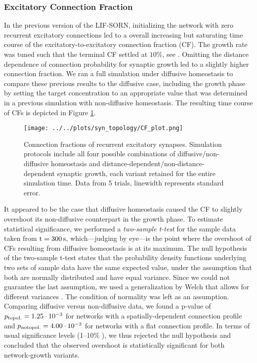 \documentclass[10pt,a4paper]{article}
\begin{document}
\subsubsection{Excitatory Connection Fraction}
In the previous version of the LIF-SORN, initializing the network with zero recurrent excitatory connections led to a overall increasing but saturating time course of the excitatory-to-excitatory connection fraction (CF). The growth rate was tuned such that the terminal CF settled at $\mathrm{10\%}$, see \cite[p. 8]{SORN_Paper}. Omitting the distance dependence of connection probability for synaptic growth led to a slightly higher connection fraction. We ran a full simulation under diffusive homeostasis to compare these previous results to the diffusive case, including the growth phase by setting the target concentration to an appropriate value that was determined in a previous simulation with non-diffusive homeostasis. The resulting time course of CFs is depicted in Figure \ref{CF_plot}.
\begin{figure}
\texttt{[image: ../../plots/syn\_topology/CF\_plot.png]}
\caption[Connection fractions of recurrent excitatory synapses]{Connection fractions of recurrent excitatory synapses. Simulation protocols include all four possible combinations of diffusive/non-diffusive homeostasis and distance-dependent/non-distance-dependent synaptic growth, each variant retained for the entire simulation time. Data from 5 trials, linewidth represents standard error.}
\label{CF_plot}
\end{figure}
It appeared to be the case that diffusive homeostasis caused the CF to slightly overshoot its non-diffusive counterpart in the growth phase. To estimate statistical significance, we performed a \textit{two-sample t-test} for the sample data taken from $\rm t = 300\, s$, which---judging by eye---is the point where the overshoot of CFs resulting from diffusive homeostasis is at its maximum. The null hypothesis of the two-sample t-test states that the probability density functions underlying two sets of sample data have the same expected value, under the assumption that both are normally distributed \cite{EncyMath_t_test} and have equal variance. Since we could not guarantee the last assumption, we used a generalization by Welch that allows for different variances \cite{Welch_1947}. The condition of normality was left as an assumption. Comparing diffusive versus non-diffusive data, we found a p-value of $p_{\rm topol.} = \rm 1.25 \cdot 10^{-3}$ for networks with a spatially-dependent connection profile and $p_{\rm no topol.} = \rm 4.00 \cdot 10^{-3}$ for networks with a flat connection profile. In terms of usual significance levels (1--10\% \cite{EncyMath_sign_level}), we thus rejected the null hypothesis and concluded that the observed overshoot is statistically significant for both network-growth variants.
\end{document}
